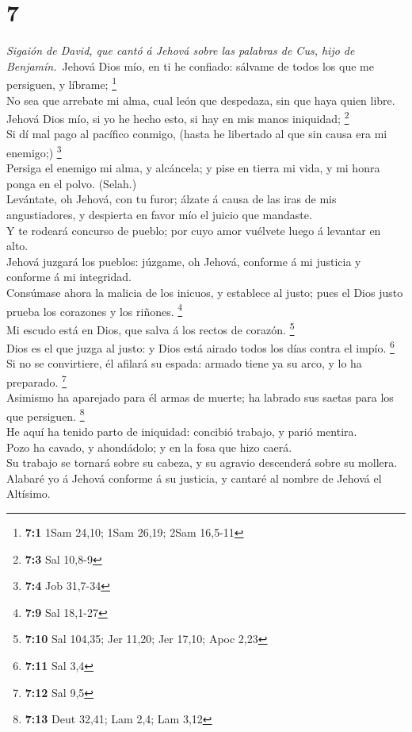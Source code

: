 \hypertarget{section-6}{%
\section{7}\label{section-6}}

 \emph{Sigaión de David, que cantó á Jehová sobre las
palabras de Cus, hijo de Benjamín.}~Jehová Dios mío, en ti he confiado:
sálvame de todos los que me persiguen, y líbrame; \footnote{\textbf{7:1}
  1Sam 24,10; 1Sam 26,19; 2Sam 16,5-11}\\
 No sea que arrebate mi alma, cual león que despedaza, sin
que haya quien libre.\\
 Jehová Dios mío, si yo he hecho esto, si hay en mis manos
iniquidad; \footnote{\textbf{7:3} Sal 10,8-9}\\
 Si dí mal pago al pacífico conmigo, (hasta he libertado al
que sin causa era mi enemigo;) \footnote{\textbf{7:4} Job 31,7-34}\\
 Persiga el enemigo mi alma, y alcáncela; y pise en tierra
mi vida, y mi honra ponga en el polvo. (Selah.)\\
 Levántate, oh Jehová, con tu furor; álzate á causa de las
iras de mis angustiadores, y despierta en favor mío el juicio que
mandaste.\\
 Y te rodeará concurso de pueblo; por cuyo amor vuélvete
luego á levantar en alto.\\
 Jehová juzgará los pueblos: júzgame, oh Jehová, conforme á
mi justicia y conforme á mi integridad.\\
 Consúmase ahora la malicia de los inicuos, y establece al
justo; pues el Dios justo prueba los corazones y los riñones.
\footnote{\textbf{7:9} Sal 18,1-27}\\
 Mi escudo está en Dios, que salva á los rectos de corazón.
\footnote{\textbf{7:10} Sal 104,35; Jer 11,20; Jer 17,10; Apoc 2,23}\\
 Dios es el que juzga al justo: y Dios está airado todos
los días contra el impío. \footnote{\textbf{7:11} Sal 3,4}\\
 Si no se convirtiere, él afilará su espada: armado tiene
ya su arco, y lo ha preparado. \footnote{\textbf{7:12} Sal 9,5}\\
 Asimismo ha aparejado para él armas de muerte; ha labrado
sus saetas para los que persiguen. \footnote{\textbf{7:13} Deut 32,41;
  Lam 2,4; Lam 3,12}\\
 He aquí ha tenido parto de iniquidad: concibió trabajo, y
parió mentira.\\
 Pozo ha cavado, y ahondádolo; y en la fosa que hizo
caerá.\\
 Su trabajo se tornará sobre su cabeza, y su agravio
descenderá sobre su mollera.\\
 Alabaré yo á Jehová conforme á su justicia, y cantaré al
nombre de Jehová el Altísimo.

